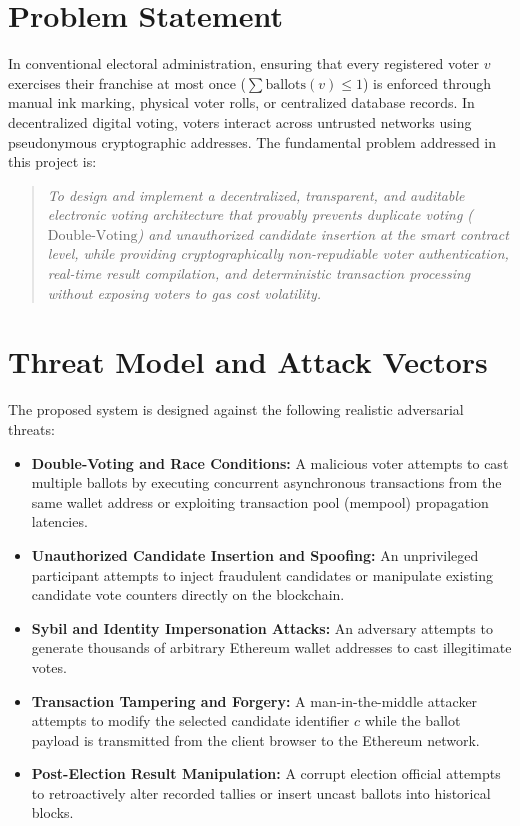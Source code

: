 \documentclass[12pt,a4paper]{report}
\begin{document}
\section{Problem Statement}
In conventional electoral administration, ensuring that every registered voter $v$ exercises their franchise at most once ($\sum \text{ballots}(v) \le 1$) is enforced through manual ink marking, physical voter rolls, or centralized database records. In decentralized digital voting, voters interact across untrusted networks using pseudonymous cryptographic addresses. The fundamental problem addressed in this project is:
\begin{quote}
\textit{To design and implement a decentralized, transparent, and auditable electronic voting architecture that provably prevents duplicate voting ($\text{Double-Voting}$) and unauthorized candidate insertion at the smart contract level, while providing cryptographically non-repudiable voter authentication, real-time result compilation, and deterministic transaction processing without exposing voters to gas cost volatility.}
\end{quote}

\clearpage
\section{Threat Model and Attack Vectors}
The proposed system is designed against the following realistic adversarial threats:
\begin{itemize}
    \item \textbf{Double-Voting and Race Conditions:} A malicious voter attempts to cast multiple ballots by executing concurrent asynchronous transactions from the same wallet address or exploiting transaction pool (mempool) propagation latencies.
    \item \textbf{Unauthorized Candidate Insertion and Spoofing:} An unprivileged participant attempts to inject fraudulent candidates or manipulate existing candidate vote counters directly on the blockchain.
    \item \textbf{Sybil and Identity Impersonation Attacks:} An adversary attempts to generate thousands of arbitrary Ethereum wallet addresses to cast illegitimate votes.
    \item \textbf{Transaction Tampering and Forgery:} A man-in-the-middle attacker attempts to modify the selected candidate identifier $c$ while the ballot payload is transmitted from the client browser to the Ethereum network.
    \item \textbf{Post-Election Result Manipulation:} A corrupt election official attempts to retroactively alter recorded tallies or insert uncast ballots into historical blocks.
\end{itemize}
\end{document}
